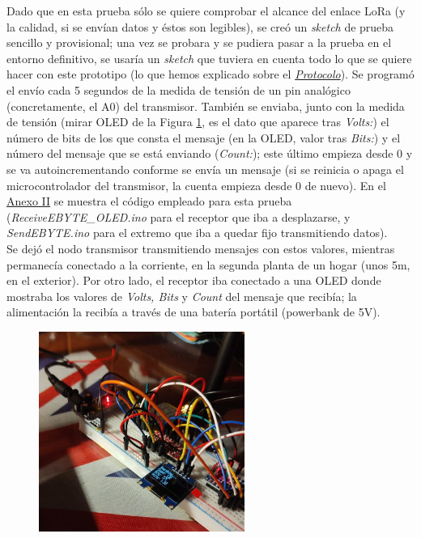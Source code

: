 \documentclass[12pt]{article}
\begin{document}
	\noindent  Dado que en esta prueba sólo se quiere comprobar el alcance del enlace LoRa (y la calidad, si se envían datos y éstos son legibles), se creó un \textit{sketch} de prueba sencillo y provisional; una vez se probara y se pudiera pasar a la prueba en el entorno definitivo, se usaría un \textit{sketch} que tuviera en cuenta todo lo que se quiere hacer con este prototipo (lo que hemos explicado sobre el \hyperref[protocolo explicacion]{\textit{Protocolo}}). Se programó el envío cada 5 segundos de la medida de tensión de un pin analógico (concretamente, el A0) del transmisor. También se enviaba, junto con la medida de tensión (mirar OLED de la Figura \ref{protoboard lora oled}, es el dato que aparece tras \textit{Volts:}) el número de bits de los que consta el mensaje (en la OLED, valor tras \textit{Bits:}) y el número del mensaje que se está enviando (\textit{Count:}); este último empieza desde 0 y se va autoincrementando conforme se envía un mensaje (si se reinicia o apaga el microcontrolador del transmisor, la cuenta empieza desde 0 de nuevo). En el \hyperref[anexo II: codigo]{Anexo II} se muestra el código empleado para esta prueba (\textit{ReceiveEBYTE\_OLED.ino} para el receptor que iba a desplazarse, y \textit{SendEBYTE.ino} para el extremo que iba a quedar fijo transmitiendo datos).\\
	
	\noindent Se dejó el nodo transmisor transmitiendo mensajes con estos valores, mientras permanecía conectado a la corriente, en la segunda planta de un hogar (unos 5m, en el exterior). Por otro lado, el receptor iba conectado a una OLED donde mostraba los valores de \textit{Volts, Bits} y \textit{Count} del mensaje que recibía; la alimentación la recibía a través de una batería portátil (powerbank de 5V).  \\
	
	
	
	\begin{figure}[h!]
		\begin{center}
			\includegraphics[width=0.6\textwidth]{img/prueba_lora_protoboard_oled.png}
			\caption{}
			\label{protoboard lora oled}
		\end{center}
	\end{figure}
\end{document}

